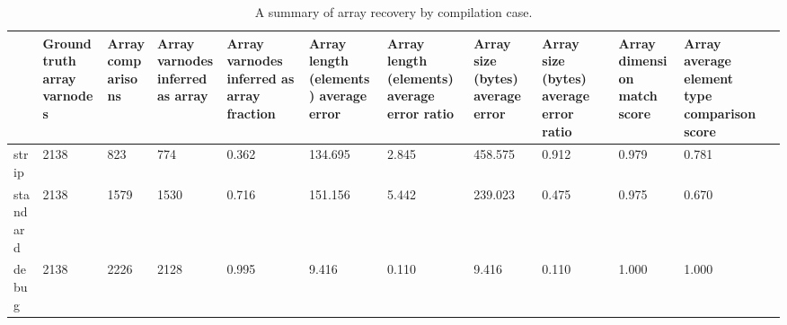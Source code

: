 \begin{table*}[tb]
\centering
\caption{A summary of array recovery by compilation case.}
\label{table:opts-array-comparisons-summary}
\begin{tabular}{lp{1.09cm}p{1.09cm}p{1.09cm}p{1.09cm}p{1.09cm}p{1.09cm}p{1.09cm}p{1.09cm}p{1.09cm}p{1.09cm}p{1.09cm}}
\toprule
{} & {Ground truth array varnodes} & {Array comparisons} & {Array varnodes inferred as array} & {Array varnodes inferred as array fraction} & {Array length (elements) average error} & {Array length (elements) average error ratio} & {Array size (bytes) average error} & {Array size (bytes) average error ratio} & {Array dimension match score} & {Array average element type comparison score} \\
\midrule
strip    &                                        2138 &                               823 &                                              774 &                                              0.362 &                                            134.695 &                                              2.845 &                                          458.575 &                                              0.912 &                                       0.979 &                                              0.781 \\
standard &                                        2138 &                              1579 &                                             1530 &                                              0.716 &                                            151.156 &                                              5.442 &                                          239.023 &                                              0.475 &                                       0.975 &                                              0.670 \\
debug    &                                        2138 &                              2226 &                                             2128 &                                              0.995 &                                              9.416 &                                              0.110 &                                            9.416 &                                              0.110 &                                       1.000 &                                              1.000 \\
\bottomrule
\end{tabular}
\end{table*}
